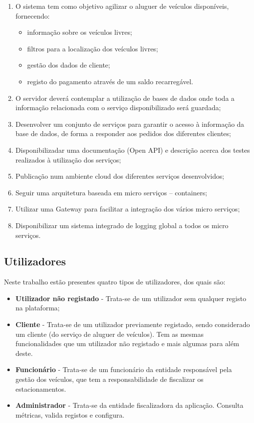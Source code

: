 \documentclass[11pt]{report}
\begin{document}
\begin{enumerate}
\item O sistema tem como objetivo agilizar o aluguer de veículos disponíveis, fornecendo:
\begin{itemize}
\item informação sobre os veículos livres;
\item filtros para a localização dos veículos livres;
\item gestão dos dados de cliente;
\item registo do pagamento através de um saldo recarregável.

\end{itemize}

\item O servidor deverá contemplar a utilização de bases de dados onde toda a informação
relacionada com o serviço disponibilizado será guardada;

\item Desenvolver um
conjunto de serviços para garantir o acesso à informação da base de dados, de forma a
responder aos pedidos dos diferentes clientes;

\item Disponibilizadar uma documentação (Open API) e descrição acerca dos testes realizados à utilização dos serviços;
\item Publicação num ambiente cloud dos diferentes serviços
desenvolvidos;
\item Seguir uma arquitetura baseada em micro serviços – containers;

\item Utilizar uma Gateway para facilitar a integração dos vários micro serviços;
\item  Disponibilizar um sistema integrado de logging global a todos os micro serviços.

\end{enumerate}
\clearpage


\subsection*{Utilizadores}

Neste trabalho estão presentes quatro tipos de utilizadores, dos quais são:
\begin{itemize}
\item \textbf{Utilizador não registado} - Trata-se de um utilizador sem qualquer registo na plataforma;
\item \textbf{Cliente} - Trata-se de um utilizador previamente registado,
sendo considerado um cliente (do serviço de aluguer de veículos). Tem as mesmas funcionalidades que um utilizador não registado e mais algumas
para além deste.
\item \textbf{Funcionário} - Trata-se de um funcionário da entidade responsável pela gestão dos veículos,
que tem a responsabilidade de fiscalizar os estacionamentos.
\item \textbf{Administrador} - Trata-se da entidade fiscalizadora da aplicação. Consulta métricas, valida registos e configura.\\
\end{itemize}
\end{document}
